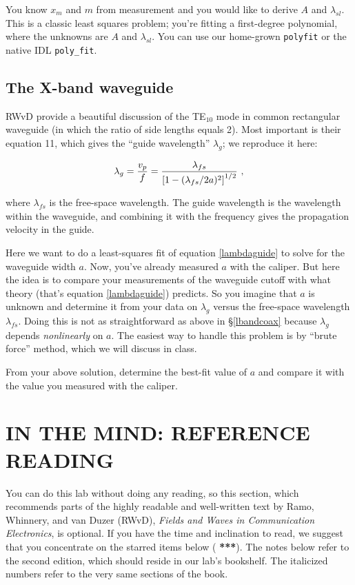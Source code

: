 \documentclass[12pt,preprint]{aastex}
\begin{document}
\noindent You know $x_m$ and $m$ from measurement and you would like to
derive $A$ and $\lambda_{sl}$. This is a classic least squares problem;
you're fitting a first-degree polynomial, where the unknowns are $A$ and
$\lambda_{sl}$. You can use our home-grown {\tt polyfit} or the native IDL
{\tt poly\_fit}. 

\subsection{The X-band waveguide}

	RWvD provide a beautiful discussion of the TE$_{10}$ mode in
common rectangular waveguide (in which the ratio of side lengths equals
2).  Most important is their equation 11, which gives the ``guide
wavelength'' $\lambda_g$; we reproduce it here:

\begin{equation} \label{lambdaguide}
\lambda_g = {v_p \over f} = {\lambda_{fs} \over \left[ 1 - (\lambda_{fs}/2a)^2
\right]^{1/2} } \ ,
\end{equation}

\noindent where $\lambda_{fs}$ is the free-space wavelength.  The guide
wavelength is the wavelength within the waveguide, and combining it with
the frequency gives the propagation velocity in the guide. 

Here we want to do a least-squares fit of equation \ref{lambdaguide} to
solve for the waveguide width $a$. Now, you've already measured $a$ with
the caliper. But here the idea is to compare your measurements of the
waveguide cutoff with what theory (that's equation \ref{lambdaguide})
predicts. So you imagine that $a$ is unknown and determine it from your
data on $\lambda_g$ versus the free-space wavelength $\lambda_{fs}$.
Doing this is not as straightforward as above in \S \ref{lbandcoax}
because $\lambda_g$ depends {\it nonlinearly} on $a$. The easiest way to
handle
this problem is by ``brute force'' method, which we will discuss in
class. 

	From your above solution, determine the best-fit value of $a$
and compare it with the value you measured with the caliper.

\section {IN THE MIND: REFERENCE READING} \label{RWvD}

You can do this lab without doing any reading, so this section, which
recommends parts of the highly readable and well-written text by Ramo,
Whinnery, and van Duzer (RWvD), {\it Fields and Waves in Communication
  Electronics}, is optional. If you have the time and inclination to
read, we suggest that you concentrate on the starred items below ({\bf
  ***}).  The notes below refer to the second edition, which should
reside in our lab's bookshelf. The italicized numbers refer to the very
same sections of the book.
\end{document}
